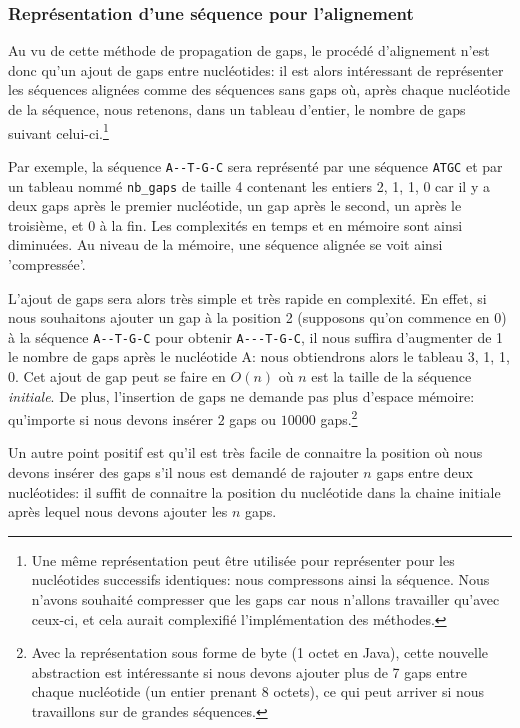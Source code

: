 \subsubsection{Représentation d'une séquence pour l'alignement}

Au vu de cette méthode de propagation de gaps, le procédé d'alignement n'est
donc qu'un ajout de gaps entre nucléotides: il est alors intéressant de
représenter les séquences alignées comme des séquences sans gaps où, après
chaque nucléotide de la séquence, nous retenons, dans un tableau d'entier, le
nombre de gaps suivant celui-ci.\footnote{Une même représentation peut être
	utilisée pour représenter pour les nucléotides successifs identiques: nous
	compressons ainsi la séquence. Nous n'avons souhaité compresser que les gaps
	car nous n'allons travailler qu'avec ceux-ci, et cela aurait complexifié
l'implémentation des méthodes.}

Par exemple, la séquence \verb|A--T-G-C| sera représenté par une séquence
\verb|ATGC| et par un tableau nommé \verb|nb_gaps| de taille 4
contenant les entiers {2, 1, 1, 0} car il y a deux gaps après le premier
nucléotide, un gap après le second, un après le troisième, et 0 à la fin. Les
complexités en temps et en mémoire sont ainsi diminuées.
Au niveau de la mémoire, une séquence alignée se voit ainsi 'compressée'.

L'ajout de gaps sera alors très simple et très rapide en complexité. En effet,
si nous souhaitons ajouter un gap à la position 2 (supposons qu'on commence en
0) à la séquence \verb|A--T-G-C| pour obtenir \verb|A---T-G-C|, il nous suffira
d'augmenter de 1 le nombre de gaps après le nucléotide A: nous obtiendrons alors
le tableau {3, 1, 1, 0}. Cet ajout de gap peut se faire en $O(n)$ où $n$ est la
taille de la séquence \textit{initiale}. De plus, l'insertion de gaps ne demande
pas plus d'espace mémoire: qu'importe si nous devons insérer $2$ gaps ou $10000$
gaps.\footnote{Avec la représentation sous forme de byte (1 octet en Java),
	cette nouvelle abstraction est intéressante si nous devons ajouter plus de 7
	gaps entre chaque nucléotide (un entier prenant 8 octets), ce qui peut
arriver si nous travaillons sur de grandes séquences.}

Un autre point positif est qu'il est très facile de connaitre la position où nous
devons insérer des gaps s'il nous est demandé de rajouter $n$ gaps entre deux
nucléotides: il suffit de connaitre la position du nucléotide dans la chaine
initiale après lequel nous devons ajouter les $n$ gaps.

